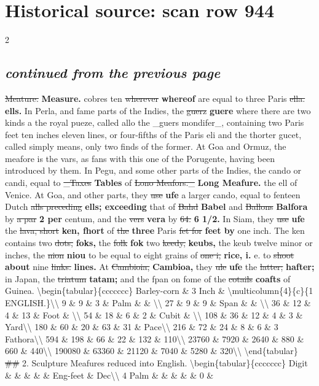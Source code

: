 \documentclass[10pt]{article}
\begin{document}
\section*{Historical source: scan row 944}
\begin{multicols}{2}
\subsection*{\textit{continued from the previous page}}
\sout{Meature.} \textbf{Measure.} cobres ten \sout{wherever} \textbf{whereof} are equal to three Paris \sout{ella.} \textbf{ells.} In Perla, and fame parts of the Indies, the \sout{guerz} \textbf{guere} where there are two kinds a the royal pueze, called allo the \_guers mondifer\_, containing two Paris feet ten inches eleven lines, or four-fifths of the Paris eli and the thorter gucet, called simply means, only two finds of the former. At Goa and Ormuz, the meafore is the vars, as fans with this one of the Porugente, having been introduced by them. In Pegu, and some other parts of the Indies, the cando or candi, equal to \sout{\_Taxes} \textbf{Tables} of \sout{Lono Meafors.\_} \textbf{Long Meafure.} the ell of Venice. At Goa, and other parts, they \sout{use} \textbf{ufe} a larger cando, equal to fenteen Dutch \sout{alls preceding} \textbf{ells; exceeding} that of \sout{Bahd} \textbf{Babel} and \sout{Ballons} \textbf{Balfora} by \sout{a par} \textbf{2 per} centum, and the \sout{vers} \textbf{vera} by \sout{64.} \textbf{6 1/2.} In Siam, they \sout{use} \textbf{ufe} the \sout{lava, short} \textbf{ken, fhort} of \sout{the} \textbf{three} Paris \sout{fet for} \textbf{feet by} one inch. The ken contains two \sout{dots,} \textbf{foks,} the \sout{folk} \textbf{fok} two \sout{keedy,} \textbf{keubs,} the keub twelve minor or inches, the \sout{nion} \textbf{niou} to be equal to eight grains of \sout{one i,} \textbf{rice, i.} e. to \sout{shoot} \textbf{about} nine \sout{links.} \textbf{lines.} At \sout{Cambioia,} \textbf{Cambioa,} they \sout{ule} \textbf{ufe} the \sout{latter;} \textbf{hafter;} in Japan, the \sout{triatum} \textbf{tatam;} and the fpan on fome of the \sout{cotails} \textbf{coafts} of Guinea. \textbackslash{}begin\{tabular\}\{ccccccc\} Barley-corn \& 3 Inch \& \textbackslash{}multicolumn\{4\}\{c\}\{1 ENGLISH.\}\textbackslash{}\textbackslash{} 9 \& 9 \& 3 \& Palm \& \& \textbackslash{}\textbackslash{} 27 \& 9 \& 9 \& Span \& \& \textbackslash{}\textbackslash{} 36 \& 12 \& 4 \& 13 \& Foot \& \textbackslash{}\textbackslash{} 54 \& 18 \& 6 \& 2 \& Cubit \& \textbackslash{}\textbackslash{} 108 \& 36 \& 12 \& 4 \& 3 \& Yard\textbackslash{}\textbackslash{} 180 \& 60 \& 20 \& 63 \& 31 \& Pace\textbackslash{}\textbackslash{} 216 \& 72 \& 24 \& 8 \& 6 \& 3 Fathora\textbackslash{}\textbackslash{} 594 \& 198 \& 66 \& 22 \& 132 \& 110\textbackslash{}\textbackslash{} 23760 \& 7920 \& 2640 \& 880 \& 660 \& 440\textbackslash{}\textbackslash{} 190080 \& 63360 \& 21120 \& 7040 \& 5280 \& 320\textbackslash{}\textbackslash{} \textbackslash{}end\{tabular\} \sout{\#\#} 2. Sculpture Meafures reduced into English. \textbackslash{}begin\{tabular\}\{ccccccc\} Digit \& \& \& \& \& Eng-feet \& Dec\textbackslash{}\textbackslash{} 4 Palm \& \& \& \& \& 0 \& 
\end{multicols}
\end{document}
